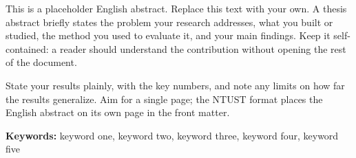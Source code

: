 

This is a placeholder English abstract. Replace this text with your own. A
thesis abstract briefly states the problem your research addresses, what you
built or studied, the method you used to evaluate it, and your main findings.
Keep it self-contained: a reader should understand the contribution without
opening the rest of the document.

State your results plainly, with the key numbers, and note any limits on how
far the results generalize. Aim for a single page; the NTUST format places the
English abstract on its own page in the front matter.

\bigskip
\noindent\textbf{Keywords:} keyword one, keyword two, keyword three, keyword four, keyword five

